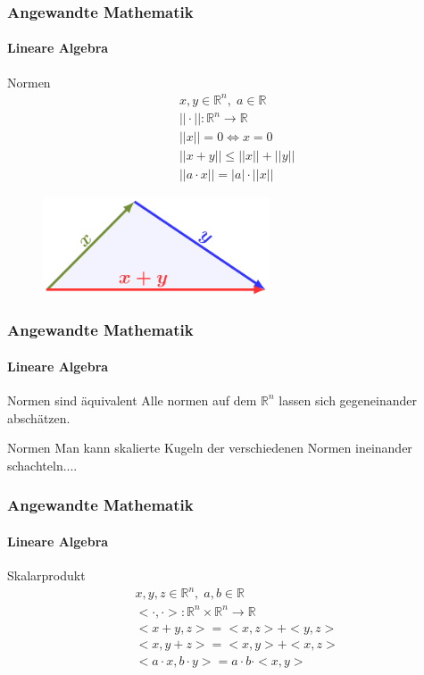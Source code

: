 \documentclass{beamer}
\begin{document}
\begin{frame}
    \frametitle{Angewandte Mathematik}
\framesubtitle{Lineare Algebra}

    \begin{block}{Normen}
\begin{align*}
  & x,y \in \mathbb{R}^n, \; a \in \mathbb{R} \\
& || \cdot || : \mathbb{R}^n \to \mathbb{R} \\
 & ||x|| = 0 \Leftrightarrow  x = 0 \\
& ||x+y|| \leq ||x|| + ||y|| \\
& ||a \cdot x|| = |a| \cdot ||x||
\end{align*}
\end{block}
\begin{figure}[H]
      \centering
    \includegraphics[width=0.6\textwidth]{images/triangle-inequality}
\end{figure}

 \end{frame}


\begin{frame}
    \frametitle{Angewandte Mathematik}
\framesubtitle{Lineare Algebra}

    \begin{block}{Normen sind äquivalent}
Alle normen auf dem $\mathbb{R}^n$ lassen sich gegeneinander abschätzen.

\end{block}
    \begin{block}{Normen}
Man kann skalierte Kugeln der verschiedenen Normen ineinander schachteln....
\end{block}


 \end{frame}



\begin{frame}
    \frametitle{Angewandte Mathematik}
\framesubtitle{Lineare Algebra}
 \begin{block}{Skalarprodukt}
\begin{align*}
  & x,y,z \in \mathbb{R}^n, \; a,b \in \mathbb{R} \\
& < \cdot, \cdot > : \mathbb{R}^n \times \mathbb{R}^n  \to \mathbb{R} \\
& <x+y, z> = <x,z> + <y,z> \\
& <x, y+z> = <x,y> + <x,z> \\
& <a\cdot x, b \cdot y> = a \cdot b \cdot <x,y>  
\end{align*}
\end{block}
 \end{frame}
\end{document}
